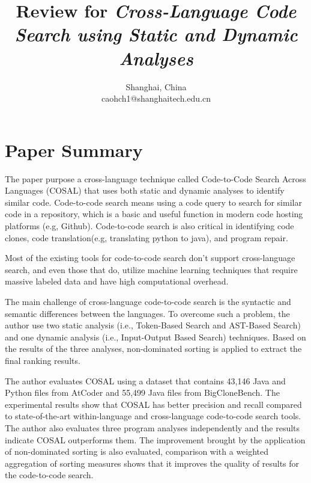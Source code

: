 \documentclass[conference]{IEEEtran}
\begin{document}
\title{Review for \textit{Cross-Language Code Search using Static and Dynamic Analyses}}


\author{
Shanghai, China\\
caohch1@shanghaitech.edu.cn}

\maketitle

\section{Paper Summary}
The paper purpose a cross-language technique called Code-to-Code Search Across Languages (COSAL) that uses both static and dynamic analyses to identify similar code. Code-to-code search means using a code query to search for similar code in a repository, which is a basic and useful function in modern code hosting platforms (e.g, Github). Code-to-code search is also critical in identifying code clones, code translation(e.g, translating python to java), and program repair.

Most of the existing tools for code-to-code search don’t support cross-language search, and even those that do, utilize machine learning techniques that require massive labeled data and have high computational overhead.

The main challenge of cross-language code-to-code search is the syntactic and semantic differences between the languages. To overcome such a problem, the author use two static analysis (i.e., Token-Based Search and AST-Based Search) and one dynamic analysis (i.e., Input-Output Based Search) techniques. Based on the results of the three analyses, non-dominated sorting is applied to extract the final ranking results. 

The author evaluates COSAL using a dataset that contains 43,146 Java and Python files from AtCoder and 55,499 Java files from BigCloneBench. The experimental results show that COSAL has better precision and recall compared to state-of-the-art within-language and cross-language code-to-code search tools. The author also evaluates three program analyses independently and the results indicate COSAL outperforms them. The improvement brought by the application of non-dominated sorting is also evaluated, comparison with a weighted aggregation of sorting measures shows that it improves the quality of results for the code-to-code search.
\end{document}
